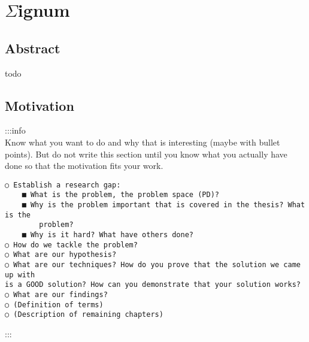 \documentclass[
]{article}
\author{}
\date{}
\begin{document}
\hypertarget{header-n0}{%
\section{\texorpdfstring{\(\Sigma\)ignum}{\textbackslash Sigmaignum}}\label{header-n0}}

\hypertarget{header-n2}{%
\subsection{Abstract}\label{header-n2}}

todo

\hypertarget{header-n4}{%
\subsection{Motivation}\label{header-n4}}

:::info\\
Know what you want to do and why that is interesting (maybe with bullet
points). But do not write this section until you know what you actually
have done so that the motivation fits your work.

\begin{verbatim}
○ Establish a research gap:
    ■ What is the problem, the problem space (PD)?
    ■ Why is the problem important that is covered in the thesis? What is the
        problem?
    ■ Why is it hard? What have others done?
○ How do we tackle the problem?
○ What are our hypothesis?
○ What are our techniques? How do you prove that the solution we came up with 
is a GOOD solution? How can you demonstrate that your solution works?
○ What are our findings?
○ (Definition of terms)
○ (Description of remaining chapters)
\end{verbatim}

:::
\end{document}
